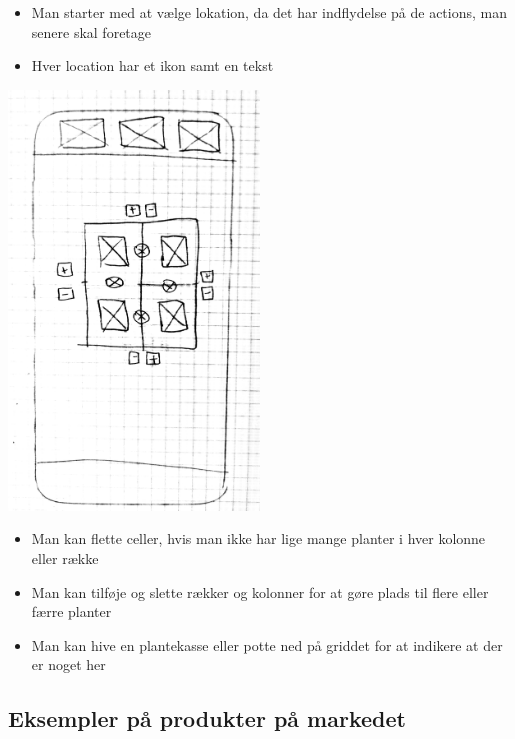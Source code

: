 \begin{itemize}
    \item Man starter med at vælge lokation, da det har indflydelse på de actions, man senere skal foretage
    \item Hver location har et ikon samt en tekst
\end{itemize}

\includegraphics[width=0.5\textwidth]{img/s1-8.jpg}\\

\begin{itemize}
    \item Man kan flette celler, hvis man ikke har lige mange planter i hver kolonne eller række
    \item Man kan tilføje og slette rækker og kolonner for at gøre plads til flere eller færre planter
    \item Man kan hive en plantekasse eller potte ned på griddet for at indikere at der er noget her
\end{itemize}

\subsection{Eksempler på produkter på markedet}

